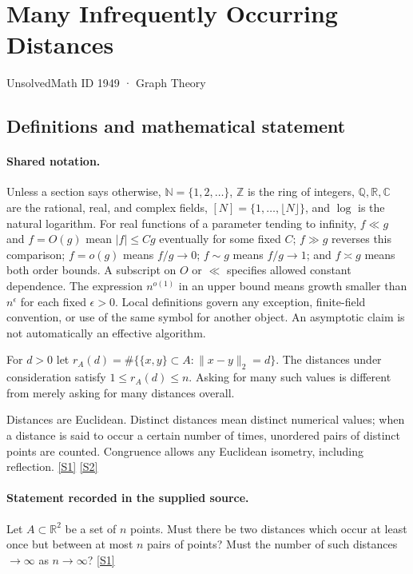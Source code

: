 \documentclass[11pt,a4paper]{article}
\newcommand{\N}{\mathbb{N}}
\newcommand{\Z}{\mathbb{Z}}
\newcommand{\Q}{\mathbb{Q}}
\newcommand{\R}{\mathbb{R}}
\newcommand{\C}{\mathbb{C}}
\newcommand{\sref}[2]{\hyperlink{source:#1:#2}{[S#2]}}
\begin{document}

\setcounter{section}{1948}

\section{Many Infrequently Occurring Distances}\label{1949}

{\small\sffamily UnsolvedMath ID 1949 · Graph Theory}

\subsection{Definitions and mathematical statement}

\paragraph{Shared notation.}Unless a section says otherwise, $\N=\{1,2,\ldots\}$,
$\Z$ is the ring of integers, $\Q,\R,\C$ are the rational, real, and complex
fields, $[N]=\{1,\ldots,\lfloor N\rfloor\}$, and $\log$ is the natural
logarithm. For real functions of a parameter tending to infinity,
$f\ll g$ and $f=O(g)$ mean $|f|\leq Cg$ eventually for some fixed $C$;
$f\gg g$ reverses this comparison; $f=o(g)$ means $f/g\to0$;
$f\sim g$ means $f/g\to1$; and $f\asymp g$ means both order bounds.
A subscript on $O$ or $\ll$ specifies allowed constant dependence.
The expression $n^{o(1)}$ in an upper bound means growth smaller than
$n^\epsilon$ for each fixed $\epsilon>0$. Local definitions govern any
exception, finite-field convention, or use of the same symbol for another
object. An asymptotic claim is not automatically an effective algorithm.



For $d>0$ let $r_A(d)=\#\{\{x,y\}\subset A:\|x-y\|_2=d\}$. The distances under consideration satisfy $1\leq r_A(d)\leq n$. Asking for many such values is different from merely asking for many distances overall.

Distances are Euclidean. Distinct distances mean distinct numerical values; when a distance is said to occur a certain number of times, unordered pairs of distinct points are counted. Congruence allows any Euclidean isometry, including reflection. \sref{1949}{1} \sref{1949}{2}

\paragraph{Statement recorded in the supplied source.}
Let $A\subset \mathbb{R}^2$ be a set of $n$ points. Must there be two distances which occur at least once but between at most $n$ pairs of points? Must the number of such distances $\to \infty$ as $n\to \infty$? \sref{1949}{1}
\end{document}
